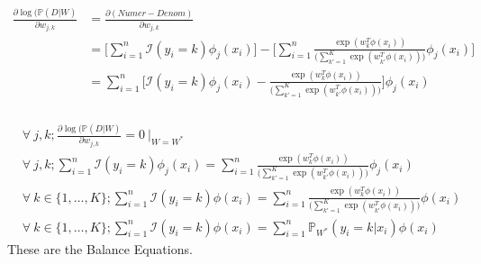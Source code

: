 \documentclass[12pt, fleqn]{article}
\begin{document}
\subsubsection{}
\begin{equation*}
  \begin{aligned}
    \frac{\partial \log (\mathbb{P}(D|W)}{\partial w_{j,k}} & = \frac{\partial (Numer - Denom)}{\partial w_{j,k}}                                                                                                                                           \\
                                                            & = \bigg[ \sum_{i=1}^n \mathcal{I}(y_i = k) \phi_j(x_i) \bigg] - \bigg[ \sum_{i=1}^n \frac{\exp (w_{k}^T \phi(x_i))}{\bigg( \sum_{k'=1}^K \exp (w_{k'}^T \phi(x_i)) \bigg)} \phi_j(x_i) \bigg] \\
                                                            & = \sum_{i=1}^n \bigg[ \mathcal{I}(y_i = k) \phi_j(x_i) - \frac{\exp (w_{k}^T \phi(x_i))}{\bigg( \sum_{k'=1}^K \exp (w_{k'}^T \phi(x_i)) \bigg)} \bigg] \phi_j(x_i)
  \end{aligned}
\end{equation*}

\subsubsection{}
\begin{equation*}
  \begin{aligned}
     & \forall \ j,k;  \frac{\partial \log (\mathbb{P}(D|W)}{\partial w_{j,k}} = 0 \ \bigg\vert_{W = W^*}                                                                                           \\
     & \forall \ j,k;  \sum_{i=1}^n \mathcal{I}(y_i = k) \phi_j(x_i) = \sum_{i=1}^n \frac{\exp (w_{k}^T \phi(x_i))}{\bigg( \sum_{k'=1}^K \exp (w_{k'}^T \phi(x_i)) \bigg)} \phi_j(x_i)              \\
     & \forall \ k \in \{1, \dots, K\}; \sum_{i=1}^n \mathcal{I}(y_i = k) \phi(x_i) = \sum_{i=1}^n \frac{\exp (w_{k}^T \phi(x_i))}{\bigg( \sum_{k'=1}^K \exp (w_{k'}^T \phi(x_i)) \bigg)} \phi(x_i) \\
     & \forall \ k \in \{1, \dots, K\}; \sum_{i=1}^n \mathcal{I} (y_i = k) \phi(x_i) = \sum_{i=1}^n \mathbb{P}_{W^*} (y_i = k | x_i) \phi(x_i)
  \end{aligned}
\end{equation*}
These are the Balance Equations.
\end{document}
